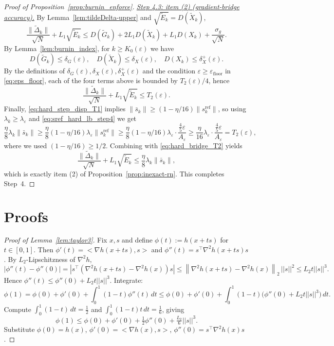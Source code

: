 \documentclass[11pt,a4paper]{article}
\def\norm#1{||#1||}%
\def\ip#1#2{<#1,#2>}%
\newcommand{\ip}[2]{\left\langle #1,#2\right\rangle}
\newcommand{\norm}[1]{\left\|#1\right\|}
\newcommand{\normtwo}[1]{\left\|#1\right\|_2}
\begin{document}
\begin{proof}[Proof of Proposition~\ref{prop:burnin_enforce}]
\smallskip
\noindent\underline{\emph{Step 4.3: item (2) (gradient-bridge accuracy).}}
By Lemma~\ref{lem:tildeDelta-upper} and $\sqrt{\tilde E_k}=D(\tilde X_k)$,
\[
\frac{\|\tilde\Delta_k\|}{\sqrt N}+L_1\sqrt{\tilde E_k}
\le
D(\tilde G_k)+2L_1 D(\tilde X_k)+L_1 D(X_k)+\frac{\sigma_g}{\sqrt N}.
\]
By Lemma~\ref{lem:burnin_index}, for $k\ge K_0(\varepsilon)$ we have
\[
D(\tilde G_k)\le \delta_G(\varepsilon),\quad
D(\tilde X_k)\le \delta_X(\varepsilon),\quad
D(X_k)\le \delta_X^{+}(\varepsilon).
\]
By the definitions of $\delta_G(\varepsilon),\delta_X(\varepsilon),\delta_X^{+}(\varepsilon)$
and the condition $\varepsilon\ge \varepsilon_{\mathrm{floor}}$ in \eqref{eq:eps_floor},
each of the four terms above is bounded by $T_2(\varepsilon)/4$, hence
\begin{equation}\label{eq:hard_bridge_T2}
	\frac{\|\tilde\Delta_k\|}{\sqrt N}+L_1\sqrt{\tilde E_k}\le T_2(\varepsilon).
\end{equation}
Finally, \eqref{eq:hard_step_disp_T1} implies $\|\bar s_k\|\ge (1-\eta/16)\|s_k^{\mathrm{ref}}\|$,
so using $\lambda_k\ge \lambda_\varepsilon$ and \eqref{eq:sref_hard_lb_step4} we get
\[
\frac{\eta}{8}\lambda_k\|\bar s_k\|
\ge
\frac{\eta}{8}(1-\eta/16)\lambda_\varepsilon\|s_k^{\mathrm{ref}}\|
\ge
\frac{\eta}{8}(1-\eta/16)\lambda_\varepsilon\cdot \frac{\frac45\varepsilon}{A_\varepsilon}
\ge
\frac{\eta}{16}\lambda_\varepsilon\cdot \frac{\frac45\varepsilon}{A_\varepsilon}
=
T_2(\varepsilon),
\]
where we used $(1-\eta/16)\ge 1/2$.
Combining with \eqref{eq:hard_bridge_T2} yields
\[
\frac{\|\tilde\Delta_k\|}{\sqrt N}+L_1\sqrt{\tilde E_k}\le \frac{\eta}{8}\lambda_k\|\bar s_k\|,
\]
which is exactly item (2) of Proposition~\ref{prop:inexact-rn}.
This completes Step~4.
	\end{proof}
	
	
	\section{Proofs}\label{app:proofs}
	
	
	\begin{proof}[Proof of Lemma~\ref{lem:taylor3}]
		Fix $x,s$ and define $\phi(t):=h(x+ts)$ for $t\in[0,1]$.
		Then $\phi'(t)=\ip{\nabla h(x+ts)}{s}$ and $\phi''(t)=s^\top\nabla^2 h(x+ts)s$.
		By $L_2$-Lipschitzness of $\nabla^2 h$,
		\[
		|\phi''(t)-\phi''(0)|
		=|s^\top(\nabla^2 h(x+ts)-\nabla^2 h(x))s|
		\le \normtwo{\nabla^2 h(x+ts)-\nabla^2 h(x)}\,\norm{s}^2
		\le L_2 t\norm{s}^3.
		\]
		Hence $\phi''(t)\le \phi''(0)+L_2 t\norm{s}^3$. Integrate:
		\[
		\phi(1)=\phi(0)+\phi'(0)+\int_0^1 (1-t)\phi''(t)\,dt
		\le \phi(0)+\phi'(0)+\int_0^1(1-t)\big(\phi''(0)+L_2 t\norm{s}^3\big)\,dt.
		\]
		Compute $\int_0^1(1-t)\,dt=\frac12$ and $\int_0^1(1-t)t\,dt=\frac16$, giving
		\[
		\phi(1)\le \phi(0)+\phi'(0)+\tfrac12\phi''(0)+\tfrac{L_2}{6}\norm{s}^3.
		\]
		Substitute $\phi(0)=h(x)$, $\phi'(0)=\ip{\nabla h(x)}{s}$, $\phi''(0)=s^\top\nabla^2 h(x)s$.
	\end{proof}
	
\end{document}
